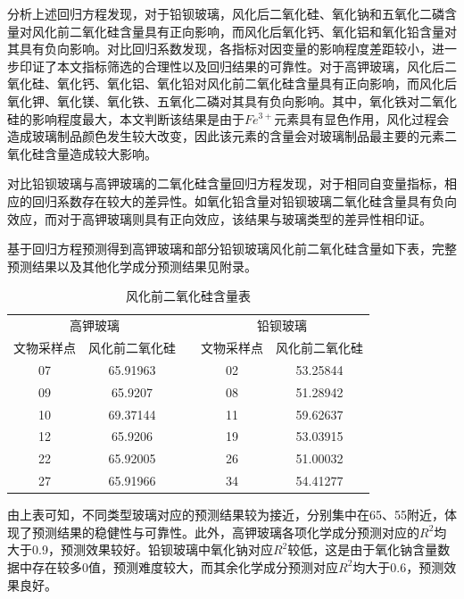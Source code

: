 \documentclass[withoutpreface,bwprint]{cumcmthesis} %
\begin{document}
分析上述回归方程发现，对于铅钡玻璃，风化后二氧化硅、氧化钠和五氧化二磷含量对风化前二氧化硅含量具有正向影响，而风化后氧化钙、氧化铝和氧化铅含量对其具有负向影响。对比回归系数发现，各指标对因变量的影响程度差距较小，进一步印证了本文指标筛选的合理性以及回归结果的可靠性。对于高钾玻璃，风化后二氧化硅、氧化钙、氧化铝、氧化铅对风化前二氧化硅含量具有正向影响，而风化后氧化钾、氧化镁、氧化铁、五氧化二磷对其具有负向影响。其中，氧化铁对二氧化硅的影响程度最大，本文判断该结果是由于$Fe^{3+}$元素具有显色作用，风化过程会造成玻璃制品颜色发生较大改变，因此该元素的含量会对玻璃制品最主要的元素二氧化硅含量造成较大影响。

对比铅钡玻璃与高钾玻璃的二氧化硅含量回归方程发现，对于相同自变量指标，相应的回归系数存在较大的差异性。如氧化铅含量对铅钡玻璃二氧化硅含量具有负向效应，而对于高钾玻璃则具有正向效应，该结果与玻璃类型的差异性相印证。

基于回归方程预测得到高钾玻璃和部分铅钡玻璃风化前二氧化硅含量如下表，完整预测结果以及其他化学成分预测结果见附录。

\begin{table}[H]
  \centering
  \caption{风化前二氧化硅含量表}
  \begin{tabular}{ccccc}
    \toprule[1.5pt]
    \multicolumn{2}{c}{高钾玻璃} &  & \multicolumn{2}{c}{铅钡玻璃} \\ \cline{1-2} \cline{4-5} 
    文物采样点     & 风化前二氧化硅      &  & 文物采样点     & 风化前二氧化硅      \\ \hline
    07        & 65.91963     &  & 02        & 53.25844     \\
    09        & 65.9207      &  & 08        & 51.28942     \\
    10        & 69.37144     &  & 11        & 59.62637     \\
    12        & 65.9206      &  & 19        & 53.03915     \\
    22        & 65.92005     &  & 26        & 51.00032     \\
    27        & 65.91966     &  & 34        & 54.41277     \\ \bottomrule[1.5pt]
  \end{tabular}
\end{table}

由上表可知，不同类型玻璃对应的预测结果较为接近，分别集中在65、55附近，体现了预测结果的稳健性与可靠性。此外，高钾玻璃各项化学成分预测对应的$R^2$均大于0.9，预测效果较好。铅钡玻璃中氧化钠对应$R^2$较低，这是由于氧化钠含量数据中存在较多0值，预测难度较大，而其余化学成分预测对应$R^2$均大于0.6，预测效果良好。
\end{document}

